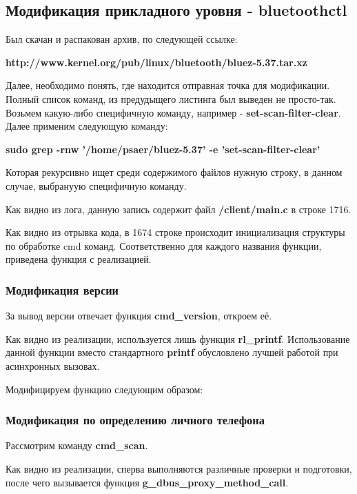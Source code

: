 \subsection{Модификация прикладного уровня - bluetoothctl}
Был скачан и распакован архив, по следующей ссылке:
\begin{center}
\textbf{http://www.kernel.org/pub/linux/bluetooth/bluez-5.37.tar.xz}
\end{center}
Далее, необходимо понять, где находится отправная точка для модификации. Полный список команд, из предудыщего листинга был выведен не просто-так. Возьмем какую-либо специфичную команду, например - \textbf{set-scan-filter-clear}. Далее применим следующую команду:
\begin{center}
\textbf{sudo grep -rnw '/home/psaer/bluez-5.37' -e 'set-scan-filter-clear'}
\end{center}
Которая рекурсивно ищет среди содержимого файлов нужную строку, в данном случае, выбрануую специфичную команду.

Как видно из лога, данную запись содержит файл \textbf{/client/main.c} в строке 1716.



Как видно из отрывка кода, в 1674 строке происходит инициализация структуры по обработке cmd команд. Соответственно для каждого названия функции, приведена функция с реализацией.

\subsubsection{Модификация версии}
За вывод версии отвечает функция \textbf{cmd\_version}, откроем её.

Как видно из реализации, используется лишь функция \textbf{rl\_printf}. Использование данной функции вместо стандартного \textbf{printf} обусловлено лучшей работой при асинхронных вызовах.

Модифицируем функцию следующим образом:


\subsubsection{Модификация по определению личного телефона}
Рассмотрим команду \textbf{cmd\_scan}.

Как видно из реализации, сперва выполняются различные проверки и подготовки, после чего вызывается функция \textbf{g\_dbus\_proxy\_method\_call}.

